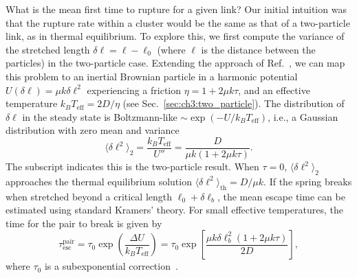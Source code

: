 What is the mean first time to rupture for a given link? Our initial intuition was that the rupture rate within a cluster would be the same as that of a two-particle link, as in thermal equilibrium. To explore this, we first compute the variance of the stretched length $\delta\ell=\ell-\ell_0$ (where $\ell$ is the distance between the particles) in the two-particle case. Extending the approach of Ref.~\cite{woillez2020active}, we can map this problem to an inertial Brownian particle in a harmonic potential $U(\delta\ell)=\mu k\delta\ell^2$ experiencing a friction $\eta=1+2\mu k\tau$, and an effective temperature $k_BT_\textrm{eff}=2D/\eta$ (see Sec.~\ref{sec:ch3:two_particle}). The distribution of $\delta\ell$ in the steady state is Boltzmann-like $\sim\exp(-U/k_B T_\textrm{eff})$, i.e., a Gaussian distribution with zero mean and variance
\begin{equation}
  \langle\delta\ell^2\rangle_2=\frac{k_BT_\mathrm{eff}}{U''}=\frac{D}{\mu k (1+2\mu k\tau)}.
\end{equation}
The subscript indicates this is the two-particle result. When $\tau=0$, $\langle\delta\ell^2\rangle_2$ approaches the thermal equilibrium solution $\langle\delta\ell^2\rangle_\mathrm{th}=D/\mu k$. If the spring breaks when stretched beyond a critical length $\ell_0+\delta\ell_b$, the mean escape time can be estimated using standard Kramers' theory. For small effective temperatures, the time for the pair to break is given by
\begin{equation}
\tau_\textrm{esc}^\textrm{pair}=\tau_0\exp\left(\frac{\Delta U}{k_B T_\mathrm{eff}}\right)=\tau_0 \exp\left[\frac{\mu k\delta\ell_b^2(1+2\mu k\tau)}{2D}\right],
\end{equation}
where $\tau_0$ is a subexponential correction~\cite{woillez2020active,gardiner2009stochastic,hanggi1990reaction,haunggi1994colored,wexler2020dynamics}.

